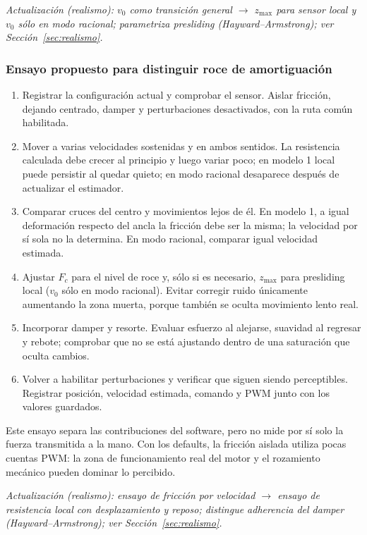 \documentclass[11pt,a4paper]{article}
\begin{document}
\textit{Actualización (realismo): $v_0$ como transición general $\rightarrow$ $z_{\max}$ para sensor local y $v_0$ sólo en modo racional; parametriza presliding (Hayward--Armstrong); ver Sección~\ref{sec:realismo}.}

\subsubsection{Ensayo propuesto para distinguir roce de amortiguación}
\begin{enumerate}
\item Registrar la configuración actual y comprobar el sensor. Aislar fricción, dejando centrado, damper y perturbaciones desactivados, con la ruta común habilitada.
\item Mover a varias velocidades sostenidas y en ambos sentidos. La resistencia calculada debe crecer al principio y luego variar poco; en modelo 1 local puede persistir al quedar quieto; en modo racional desaparece después de actualizar el estimador.
\item Comparar cruces del centro y movimientos lejos de él. En modelo 1, a igual deformación respecto del ancla la fricción debe ser la misma; la velocidad por sí sola no la determina. En modo racional, comparar igual velocidad estimada.
\item Ajustar $F_c$ para el nivel de roce y, sólo si es necesario, $z_{\max}$ para presliding local ($v_0$ sólo en modo racional). Evitar corregir ruido únicamente aumentando la zona muerta, porque también se oculta movimiento lento real.
\item Incorporar damper y resorte. Evaluar esfuerzo al alejarse, suavidad al regresar y rebote; comprobar que no se está ajustando dentro de una saturación que oculta cambios.
\item Volver a habilitar perturbaciones y verificar que siguen siendo perceptibles. Registrar posición, velocidad estimada, comando y PWM junto con los valores guardados.
\end{enumerate}
Este ensayo separa las contribuciones del software, pero no mide por sí solo la fuerza transmitida a la mano. Con los defaults, la fricción aislada utiliza pocas cuentas PWM: la zona de funcionamiento real del motor y el rozamiento mecánico pueden dominar lo percibido.

\textit{Actualización (realismo): ensayo de fricción por velocidad $\rightarrow$ ensayo de resistencia local con desplazamiento y reposo; distingue adherencia del damper (Hayward--Armstrong); ver Sección~\ref{sec:realismo}.}
\end{document}
